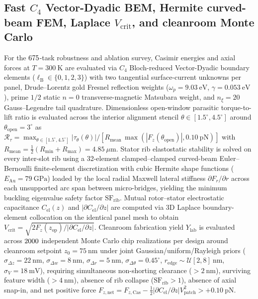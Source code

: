 \documentclass[pdflatex,sn-nature]{sn-jnl}
\begin{document}
\subsection*{Fast $C_4$ Vector-Dyadic BEM, Hermite curved-beam FEM, Laplace $V_{\mathrm{crit}}$, and cleanroom Monte Carlo}
For the $675{}$-task robustness and ablation survey, Casimir energies and axial forces at $T=300\ \mathrm{K}$ are evaluated via $C_4$ Bloch-reduced Vector-Dyadic boundary elements ($\ell_{\mathrm{B}} \in \{0,1,2,3\}$) with two tangential surface-current unknowns per panel, Drude--Lorentz gold Fresnel reflection weights ($\omega_p = 9.03\ \mathrm{eV}$, $\gamma = 0.053\ \mathrm{eV}$)\cite{rakic1998}, prime $1/2$ static $n=0$ transverse-magnetic Matsubara weight, and $n_\xi = 20$ Gauss--Legendre tail quadrature. Dimensionless open-window parasitic torque-to-lift ratio is evaluated across the interior alignment stencil $\theta \in [1.5^\circ, 4.5^\circ]$ around $\theta_{\mathrm{open}} = 3^\circ$ as $\mathcal{R}_\tau = \max_{\theta \in [1.5^\circ, 4.5^\circ]} |\tau_\theta(\theta)| / [R_{\mathrm{mean}}\,\max(|F_z(\theta_{\mathrm{open}})|, 0.10\ \mathrm{pN})]$ with $R_{\mathrm{mean}} = \frac{1}{2}(R_{\min} + R_{\max}) = 4.85\ \mu\mathrm{m}$. Stator rib elastostatic stability is solved on every inter-slot rib using a 32-element clamped--clamped curved-beam Euler--Bernoulli finite-element discretization with cubic Hermite shape functions ($E_{\mathrm{Au}} = 79\ \mathrm{GPa}$) loaded by the local radial Maxwell lateral stiffness $\partial F_r/\partial r$ across each unsupported arc span between micro-bridges, yielding the minimum buckling eigenvalue safety factor $\mathrm{SF}_{\mathrm{rib}}$. Mutual rotor--stator electrostatic capacitance $C_{\mathrm{el}}(z)$ and $|\partial C_{\mathrm{el}}/\partial z|$ are computed via 3D Laplace boundary-element collocation on the identical panel mesh to obtain $V_{\mathrm{crit}} = \sqrt{2 F_z(z_{\mathrm{op}}) / |\partial C_{\mathrm{el}}/\partial z|}$. Cleanroom fabrication yield $Y_{\mathrm{lab}}$ is evaluated across $2000{}$ independent Monte Carlo chip realizations per design around cleanroom setpoint $z_0 = 75\ \mathrm{nm}$ under joint Gaussian/uniform/Rayleigh priors ($\sigma_{\Delta z}=22\ \mathrm{nm}$, $\sigma_{\Delta w}=8\ \mathrm{nm}$, $\sigma_{\Delta r}=5\ \mathrm{nm}$, $\sigma_{\Delta\theta}=0.45^\circ$, $r_{\mathrm{edge}} \sim \mathcal{U}[2,8]\ \mathrm{nm}$, $\sigma_V = 18\ \mathrm{mV}$), requiring simultaneous non-shorting clearance ($>2\ \mathrm{nm}$), surviving feature width ($>4\ \mathrm{nm}$), absence of rib collapse ($\mathrm{SF}_{\mathrm{rib}}>1$), absence of axial snap-in, and net positive force $F_{z,\mathrm{net}} = F_{z,\mathrm{Cas}} - \frac{1}{2}|\partial C_{\mathrm{el}}/\partial z|V_{\mathrm{patch}}^2 > +0.10\ \mathrm{pN}$.
\end{document}
